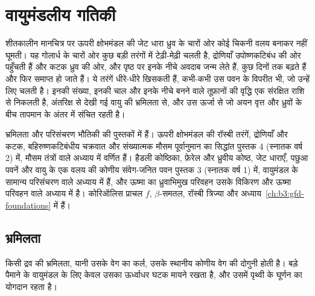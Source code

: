 \chapter{वायुमंडलीय गतिकी}\label{ch:b3:atmospheric-dynamics}

शीतकालीन मानचित्र पर ऊपरी क्षोभमंडल की जेट धारा ध्रुव के चारों ओर
कोई चिकनी वलय बनाकर नहीं घूमती। यह गोलार्ध के चारों ओर कुछ बड़ी तरंगों में टेढ़ी-मेढ़ी चलती है,
द्रोणियाँ उपोष्णकटिबंध की ओर पहुँचती हैं और कटक ध्रुव की ओर,
और पृष्ठ पर इनके नीचे अवदाब जन्म लेते हैं, कुछ दिनों तक बढ़ते हैं
और फिर समाप्त हो जाते हैं। ये तरंगें धीरे-धीरे खिसकती हैं,
कभी-कभी उस पवन के विपरीत भी, जो उन्हें लिए चलती है। इनकी संख्या,
इनकी चाल और इनके नीचे बनने वाले तूफ़ानों की वृद्धि
एक संरक्षित राशि से निकलती है, अंतरिक्ष से देखी गई वायु की भ्रमिलता से,
और उस ऊर्जा से जो अयन वृत्त और ध्रुवों के बीच तापमान के अंतर में संचित रहती है।

\begin{recall}
भ्रमिलता और परिसंचरण भौतिकी की पुस्तकों में हैं। ऊपरी क्षोभमंडल की रॉस्बी तरंगें, द्रोणियाँ और कटक,
बहिरुष्णकटिबंधीय चक्रवात और संख्यात्मक मौसम पूर्वानुमान का सिद्धांत
पुस्तक 4 (स्नातक वर्ष 2) में, मौसम तंत्रों वाले अध्याय में वर्णित हैं।
हैडली कोष्ठिका, फ़ेरेल और ध्रुवीय कोष्ठ, जेट धाराएँ,
पछुआ पवनें और वायु के एक वलय की कोणीय संवेग-जनित पवन पुस्तक 3 (स्नातक वर्ष 1) में,
वायुमंडल के सामान्य परिसंचरण वाले अध्याय में हैं,
और ऊष्मा का ध्रुवाभिमुख परिवहन उसके विकिरण और ऊष्मा परिवहन वाले अध्याय में है।
कोरिऑलिस प्राचल $f$, $\beta$-समतल,
रॉस्बी त्रिज्या और 
अध्याय~\ref{ch:b3:gfd-foundations} में हैं।
\end{recall}

\section{भ्रमिलता}\label{sec:b3:atmospheric-dynamics:vorticity}

किसी द्रव की भ्रमिलता, यानी उसके वेग का कर्ल, उसके स्थानीय
कोणीय वेग की दोगुनी होती है। बड़े पैमाने के वायुमंडल के लिए केवल उसका ऊर्ध्वाधर घटक मायने रखता है,
और उसमें पृथ्वी के घूर्णन का योगदान रहता है।

